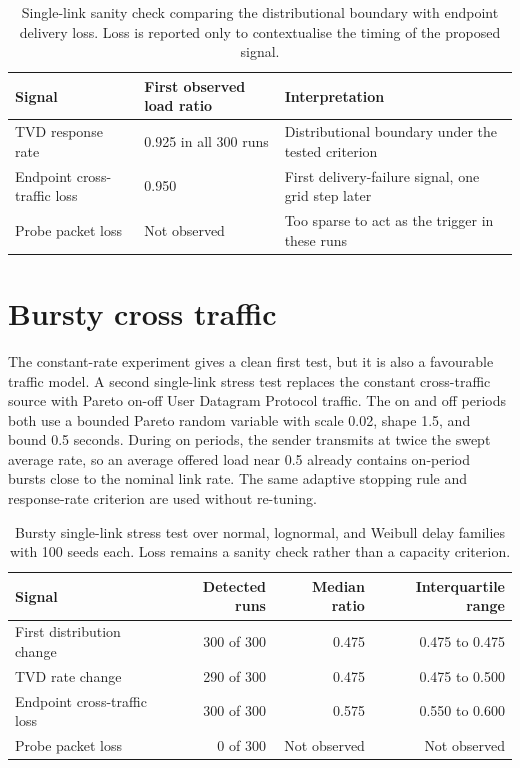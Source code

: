 \documentclass[a4paper,11pt]{report}
\begin{document}
\begin{table}[htbp]
\centering
\small
\begin{tabular}{p{}p{}p{}}
\toprule
Signal & First observed load ratio & Interpretation \\
\midrule
TVD response rate & 0.925 in all 300 runs & Distributional boundary under the tested criterion \\
Endpoint cross-traffic loss & 0.950 & First delivery-failure signal, one grid step later \\
Probe packet loss & Not observed & Too sparse to act as the trigger in these runs \\
\bottomrule
\end{tabular}
\caption{Single-link sanity check comparing the distributional boundary with endpoint delivery loss. Loss is reported only to contextualise the timing of the proposed signal.}
\label{tab:single-loss-sanity}
\end{table}

\section{Bursty cross traffic}

The constant-rate experiment gives a clean first test, but it is also a favourable traffic model. A second single-link stress test replaces the constant cross-traffic source with Pareto on-off User Datagram Protocol traffic. The on and off periods both use a bounded Pareto random variable with scale 0.02, shape 1.5, and bound 0.5 seconds. During on periods, the sender transmits at twice the swept average rate, so an average offered load near 0.5 already contains on-period bursts close to the nominal link rate. The same adaptive stopping rule and response-rate criterion are used without re-tuning.

\begin{table}[htbp]
\centering
\small
\begin{tabular}{lrrr}
\toprule
Signal & Detected runs & Median ratio & Interquartile range \\
\midrule
First distribution change & 300 of 300 & 0.475 & 0.475 to 0.475 \\
TVD rate change & 290 of 300 & 0.475 & 0.475 to 0.500 \\
Endpoint cross-traffic loss & 300 of 300 & 0.575 & 0.550 to 0.600 \\
Probe packet loss & 0 of 300 & Not observed & Not observed \\
\bottomrule
\end{tabular}
\caption{Bursty single-link stress test over normal, lognormal, and Weibull delay families with 100 seeds each. Loss remains a sanity check rather than a capacity criterion.}
\label{tab:observable-bursty-methods}
\end{table}
\end{document}
